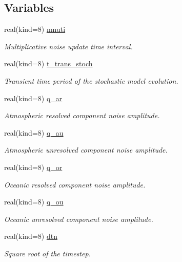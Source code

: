 \subsection*{Variables}
\begin{DoxyCompactItemize}
\item 
real(kind=8) \hyperlink{namespacestoch__params_ab0b8df90daf320dc4f5810eacd7d93e7}{mnuti}
\begin{DoxyCompactList}\small\item\em Multiplicative noise update time interval. \end{DoxyCompactList}\item 
real(kind=8) \hyperlink{namespacestoch__params_a11aa6b888c2b4005aca690fb78e2c785}{t\+\_\+trans\+\_\+stoch}
\begin{DoxyCompactList}\small\item\em Transient time period of the stochastic model evolution. \end{DoxyCompactList}\item 
real(kind=8) \hyperlink{namespacestoch__params_a56cee7780f23cbd0cc619c5b5bb30b6c}{q\+\_\+ar}
\begin{DoxyCompactList}\small\item\em Atmospheric resolved component noise amplitude. \end{DoxyCompactList}\item 
real(kind=8) \hyperlink{namespacestoch__params_a437fce848ee222fc34893831a54e32e9}{q\+\_\+au}
\begin{DoxyCompactList}\small\item\em Atmospheric unresolved component noise amplitude. \end{DoxyCompactList}\item 
real(kind=8) \hyperlink{namespacestoch__params_adc17ebaeabac74e33023f9e7bb8583ec}{q\+\_\+or}
\begin{DoxyCompactList}\small\item\em Oceanic resolved component noise amplitude. \end{DoxyCompactList}\item 
real(kind=8) \hyperlink{namespacestoch__params_a6b3308ad01c8ba1945332b05df447865}{q\+\_\+ou}
\begin{DoxyCompactList}\small\item\em Oceanic unresolved component noise amplitude. \end{DoxyCompactList}\item 
real(kind=8) \hyperlink{namespacestoch__params_aae1255323ba779a9cefd5a979762b778}{dtn}
\begin{DoxyCompactList}\small\item\em Square root of the timestep. \end{DoxyCompactList}\item 

\end{DoxyCompactItemize}
